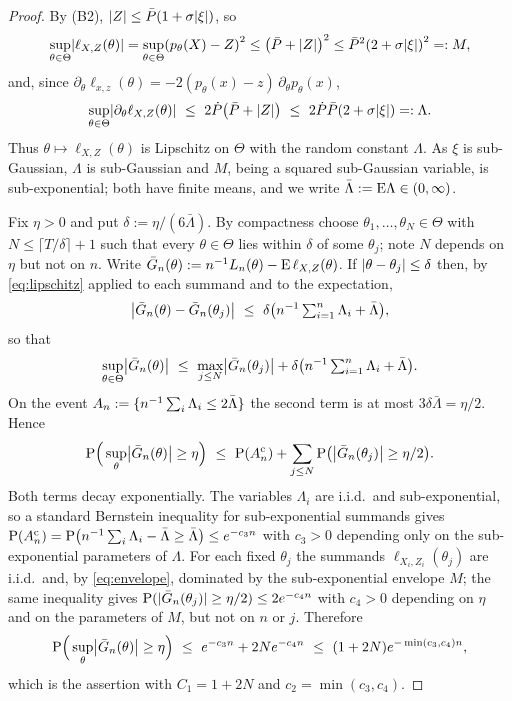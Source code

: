 \begin{proof}
By (B2), $\lvert Z\rvert\le\bar P(1+\sigma\lvert\xi\rvert)$, so
\begin{equation}\label{eq:envelope}
	\sup_{\theta\in\Theta}\abs*{\ell_{X,Z}(\theta)}=\sup_{\theta\in\Theta}\paren*{p_{\theta}(X)-Z}^{2}\le\paren*{\bar P+\abs{Z}}^{2}\le\bar P^{2}\paren*{2+\sigma\abs{\xi}}^{2}=:M,
\end{equation}
and, since $\partial_{\theta}\ell_{x,z}(\theta)=-2(p_{\theta}(x)-z)\,\partial_{\theta}p_{\theta}(x)$,
\begin{equation}\label{eq:lipschitz}
	\sup_{\theta\in\Theta}\abs*{\partial_{\theta}\ell_{X,Z}(\theta)}\ \le\ 2\dot P\paren*{\bar P+\abs{Z}}\ \le\ 2\dot P\bar P\paren*{2+\sigma\abs{\xi}}=:\Lambda .
\end{equation}
Thus $\theta\mapsto\ell_{X,Z}(\theta)$ is Lipschitz on $\Theta$ with the random constant $\Lambda$. As $\xi$ is sub-Gaussian, $\Lambda$ is sub-Gaussian and $M$, being a squared sub-Gaussian variable, is sub-exponential; both have finite means, and we write $\bar\Lambda:=\mathrm{E}\Lambda\in(0,\infty)$.

Fix $\eta>0$ and put $\delta:=\eta/(6\bar\Lambda)$. By compactness choose $\theta_{1},\ldots,\theta_{N}\in\Theta$ with $N\le\lceil T/\delta\rceil+1$ such that every $\theta\in\Theta$ lies within $\delta$ of some $\theta_{j}$; note $N$ depends on $\eta$ but not on $n$. Write $\bar G_n(\theta):=n^{-1}L_n(\theta)-\mathrm{E}\,\ell_{X,Z}(\theta)$. If $\lvert\theta-\theta_{j}\rvert\le\delta$ then, by \eqref{eq:lipschitz} applied to each summand and to the expectation,
$$
\abs*{\bar G_n(\theta)-\bar G_n(\theta_{j})}\ \le\ \delta\paren*{n^{-1}\textstyle\sum_{i=1}^{n}\Lambda_{i}+\bar\Lambda},
$$
so that
$$
\sup_{\theta\in\Theta}\abs*{\bar G_n(\theta)}\ \le\ \max_{j\le N}\abs*{\bar G_n(\theta_{j})}+\delta\paren*{n^{-1}\textstyle\sum_{i=1}^{n}\Lambda_{i}+\bar\Lambda}.
$$
On the event $A_n:=\{n^{-1}\sum_{i}\Lambda_{i}\le 2\bar\Lambda\}$ the second term is at most $3\delta\bar\Lambda=\eta/2$. Hence
$$
\Prob\Big(\sup_{\theta}\abs*{\bar G_n(\theta)}\ge\eta\Big)\ \le\ \Prob(A_n^{\mathrm{c}})+\sum_{j\le N}\Prob\big(\abs*{\bar G_n(\theta_{j})}\ge\eta/2\big).
$$
Both terms decay exponentially. The variables $\Lambda_{i}$ are i.i.d.\ and sub-exponential, so a standard Bernstein inequality for sub-exponential summands \cite{Vershynin2018} gives $\mathrm{P}(A_n^{\mathrm{c}})=\mathrm{P}\big(n^{-1}\sum_{i}\Lambda_{i}-\bar\Lambda\ge\bar\Lambda\big)\le e^{-c_{3}n}$ with $c_{3}>0$ depending only on the sub-exponential parameters of $\Lambda$. For each fixed $\theta_{j}$ the summands $\ell_{X_i,Z_i}(\theta_{j})$ are i.i.d.\ and, by \eqref{eq:envelope}, dominated by the sub-exponential envelope $M$; the same inequality gives $\mathrm{P}(\lvert\bar G_n(\theta_{j})\rvert\ge\eta/2)\le 2e^{-c_{4}n}$ with $c_{4}>0$ depending on $\eta$ and on the parameters of $M$, but not on $n$ or $j$. Therefore
$$
\Prob\Big(\sup_{\theta}\abs*{\bar G_n(\theta)}\ge\eta\Big)\ \le\ e^{-c_{3}n}+2Ne^{-c_{4}n}\ \le\ (1+2N)e^{-\min(c_{3},c_{4})n},
$$
which is the assertion with $C_1=1+2N$ and $c_2=\min(c_{3},c_{4})$.
\end{proof}


